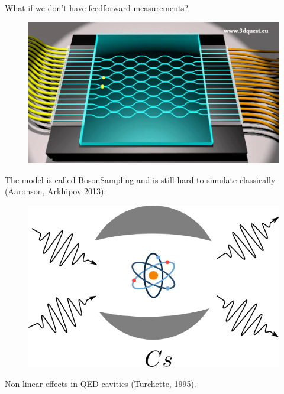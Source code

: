 \documentclass{beamer}
\begin{document}
\begin{frame}
\begin{center}

\begin{block}{}
\begin{center}
What if we don't have feedforward measurements? 
\end{center}
\end{block}

\begin{figure}[!htb]
\centering
\includegraphics[scale=.20]{immagini/Bosonsampling3.jpg}
\end{figure}

The model is called BosonSampling and is still hard to simulate classically (Aaronson, Arkhipov 2013).

\end{center}
\end{frame}



\begin{frame}
\begin{center}

\begin{figure}[!htb]
\centering
\includegraphics[scale=.50]{immagini/cavityQED.png}
\end{figure}
\vspace{15pt}

Non linear effects in QED cavities (Turchette, 1995).

\end{center}
\end{frame}
\end{document}
